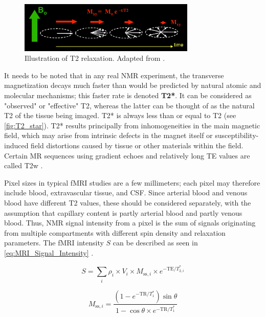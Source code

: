 \begin{figure}[htbp]
    \centering
    \includegraphics[width = 0.75\textwidth]{assets/images/T2_illustration.jpg}
    \caption[T2 Relaxation]{Illustration of T2 relaxation. Adapted from \cite{T2}.}
    \label{fig:T2}
\end{figure}

It needs to be noted that in any real \gls{NMR} experiment, the transverse magnetization decays much faster than would be predicted by natural atomic and molecular mechanisms; this faster rate is denoted \textbf{T2*}. It can be considered as "observed" or "effective" T2, whereas the latter can be thought of as the natural T2 of the tissue being imaged. T2* is always less than or equal to T2 (see \autoref{fig:T2_star}). T2* results principally from inhomogeneities in the main magnetic field, which may arise from intrinsic defects in the magnet itself or susceptibility-induced field distortions caused by tissue or other materials within the field. Certain \gls{MR} sequences using gradient echoes and relatively long \gls{TE} values are called \gls{T2w} \cite{T2_star}.

Pixel sizes in typical \gls{fMRI} studies are a few millimeters; each pixel may therefore include blood, extravascular tissue, and \gls{CSF}. Since arterial blood and venous blood have different T2 values, these should be considered separately, with the assumption that capillary content is partly arterial blood and partly venous blood. Thus, \gls{NMR} signal intensity from a pixel is the sum of signals originating from multiple compartments with different spin density and relaxation parameters. The \gls{fMRI} intensity $S$ can be described as seen in \autoref{eq:MRI_Signal_Intensity} \cite{Kim2012}.

\begin{equation}
	\label{eq:MRI_Signal_Intensity}
	S = \sum_i \rho_i \times V_i \times M_{\text{ss},i} \times e^{-\text{TE}/T_{2,i}^*}
\end{equation}

\begin{equation}
	\label{eq:ss_magnetization}
	\displaystyle M_{\text{ss},i} = \frac{\left(1 - e^{-\text{TR}/T_1^*}\right) \sin\theta}{1 - \cos\theta \times e^{-\text{TR}/T_1^*}}
\end{equation}

